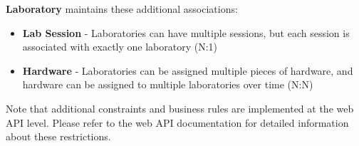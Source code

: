 \textbf{Laboratory} maintains these additional associations:
\begin{itemize}
    \item \textbf{Lab Session} - Laboratories can have multiple sessions, but each session is associated with exactly one laboratory (N:1)
    \item \textbf{Hardware} - Laboratories can be assigned multiple pieces of hardware, and hardware can be assigned to multiple laboratories over time (N:N)
\end{itemize}

Note that additional constraints and business rules are implemented at the web API level. Please refer to the web API documentation for detailed information about these restrictions.